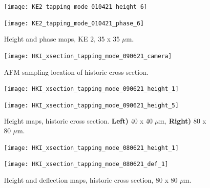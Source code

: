 \begin{figure}[H]
\centering
\begin{minipage}{.45\textwidth}
  \centering
  \texttt{[image: KE2\_tapping\_mode\_010421\_height\_6]}
\end{minipage}
\begin{minipage}{.45\textwidth}
  \centering
  \texttt{[image: KE2\_tapping\_mode\_010421\_phase\_6]}
\end{minipage}
\caption[Height and phase maps, KE 2]{Height and phase maps, KE 2, 35 x 35 $\mu$m.}
\label{fig:afm_ke2_height_phase_6}
\end{figure}





\begin{figure}[H]
\centering
  \texttt{[image: HKI\_xsection\_tapping\_mode\_090621\_camera]}
\caption[AFM sampling location of historic cross section]{AFM sampling location of historic cross section.}
\label{fig:camera_hki_xsection}
\end{figure}

\begin{figure}[H]
\centering
\begin{minipage}{.45\textwidth}
  \centering
  \texttt{[image: HKI\_xsection\_tapping\_mode\_090621\_height\_1]}
\end{minipage}
\begin{minipage}{.45\textwidth}
  \centering
  \texttt{[image: HKI\_xsection\_tapping\_mode\_090621\_height\_5]}
\end{minipage}
\caption[Height maps, historic cross section]{Height maps, historic cross section. \textbf{Left)} 40 x 40 $\mu$m, \textbf{Right)} 80 x 80 $\mu$m.}
\label{fig:afm_xsection_height_1}
\end{figure}


\begin{figure}[H]
\centering
\begin{minipage}{.45\textwidth}
  \centering
  \texttt{[image: HKI\_xsection\_tapping\_mode\_080621\_height\_1]}
\end{minipage}
\begin{minipage}{.45\textwidth}
  \centering
  \texttt{[image: HKI\_xsection\_tapping\_mode\_080621\_def\_1]}
\end{minipage}
\caption[Height and deflection maps, historic cross section]{Height and deflection maps, historic cross section, 80 x 80 $\mu$m.}
\label{fig:afm_xsection_height_def_1}
\end{figure}

